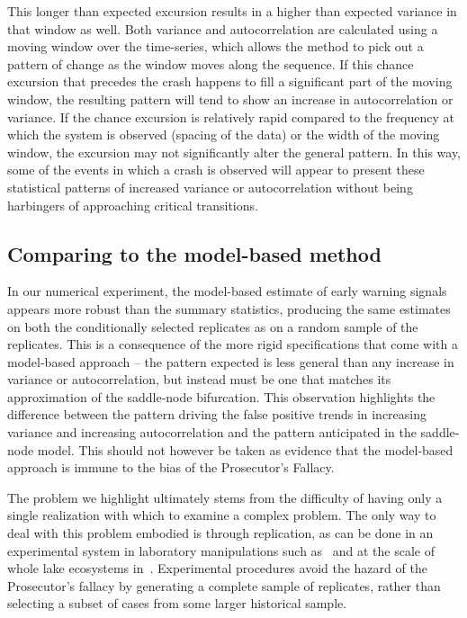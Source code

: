 \documentclass[authoryear,5p]{elsarticle}
\begin{document}
This longer than expected excursion results in a higher than expected
variance in that window as well. Both variance and autocorrelation are
calculated using a moving window over the time-series, which allows
the method to pick out a pattern of change as the window moves along
the sequence. If this chance excursion that precedes the crash happens
to fill a significant part of the moving window, the resulting pattern
will tend to show an increase in autocorrelation or variance.  If the
chance excursion is relatively rapid compared to the frequency at which
the system is observed (spacing of the data) or the width of the moving
window, the excursion may not significantly alter the general pattern.
In this way, some of the events in which a crash is observed will
appear to present these statistical patterns of increased variance
or autocorrelation without being harbingers of approaching critical
transitions.


\subsection{Comparing to the model-based method}

In our numerical experiment, the model-based estimate of early warning signals
appears more robust than the summary statistics, producing the same
estimates on both the conditionally selected replicates as on a random
sample of the replicates.  This is a consequence of the more rigid
specifications that come with a model-based approach -- the pattern
expected is less general than any increase in variance or autocorrelation,
but instead must be one that matches its approximation of the saddle-node
bifurcation. This observation highlights the difference between the
pattern driving the false positive trends in increasing variance and
increasing autocorrelation and the pattern anticipated in the saddle-node
model. This should not however be taken as evidence that the model-based
approach is immune to the bias of the Prosecutor's Fallacy.


The problem we highlight ultimately stems from the difficulty of having
only a single realization with which to examine a complex problem.
The only way to deal with this problem embodied is through replication, as
can be done in an experimental system in laboratory manipulations
such as~\citet{Drake2010, Veraart2011} and at the scale of whole lake
ecosystems in~\citet{Carpenter2011}.  
Experimental procedures avoid the hazard of the Prosecutor's fallacy by
generating a complete sample of replicates, rather than selecting a subset
of cases from some larger historical sample.  
\end{document}
